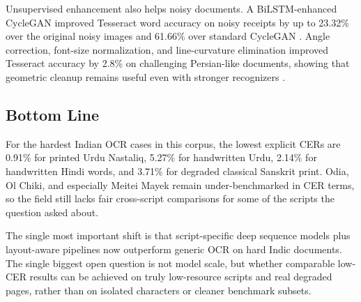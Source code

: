     
    Unsupervised enhancement also helps noisy documents. A BiLSTM-enhanced CycleGAN improved Tesseract word accuracy on noisy receipts by up to 23.32\% over the original noisy images and 61.66\% over standard CycleGAN  \cite{Singh2024Unpaired}. Angle correction, font-size normalization, and line-curvature elimination improved Tesseract accuracy by 2.8\% on challenging Persian-like documents, showing that geometric cleanup remains useful even with stronger recognizers  \cite{Fateh2023Enhancing}.
    
    
    \subsection*{Bottom Line}
    
    
    For the hardest Indian OCR cases in this corpus, the lowest explicit CERs are 0.91\% for printed Urdu Nastaliq, 5.27\% for handwritten Urdu, 2.14\% for handwritten Hindi words, and 3.71\% for degraded classical Sanskrit print. Odia, Ol Chiki, and especially Meitei Mayek remain under-benchmarked in CER terms, so the field still lacks fair cross-script comparisons for some of the scripts the question asked about.
    
    
    The single most important shift is that script-specific deep sequence models plus layout-aware pipelines now outperform generic OCR on hard Indic documents. The single biggest open question is not model scale, but whether comparable low-CER results can be achieved on truly low-resource scripts and real degraded pages, rather than on isolated characters or cleaner benchmark subsets.
    
    
    
    
    